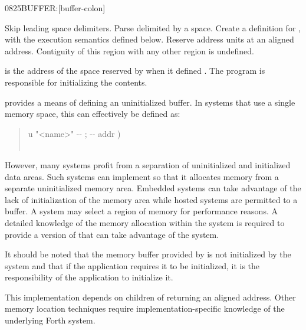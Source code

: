 \begin{worddef}{0825}{BUFFER:}[buffer-colon]%
\item {}

	Skip leading space delimiters. Parse  delimited by a space.
	Create a definition for , with the execution semantics defined
	below.  Reserve  address units at an aligned address.
	Contiguity of this region with any other region is undefined.

\execute[name]

	 is the address of the space reserved by  when
	it defined .  The program is responsible for initializing the
	contents.

	\begin{rationale}
		 provides a means of defining an uninitialized buffer.
		In systems that use a single memory space, this can effectively
		be defined as:

		\begin{quote}\ttfamily
			\word{:}   u "<name>" -{}- ; -{}- addr ) \\
			\tab\,  \\
			\word{;}
		\end{quote} 

		However, many systems profit from a separation of uninitialized and
		initialized data areas.  Such systems can implement  so
		that it allocates memory from a separate uninitialized memory area.
		Embedded systems can take advantage of the lack of initialization of the
		memory area while hosted systems are permitted to 
		a buffer.
		A system may select a region of memory for performance reasons.
		A detailed knowledge of the memory allocation within the system
		is required to provide a version of  that can take
		advantage of the system.

		It should be noted that the memory buffer provided by 
		is not initialized by the system and that if the application requires
		it to be initialized, it is the responsibility of the application to
		initialize it.
	\end{rationale}

	\begin{implement} %
		\dffamily
		This implementation depends on children of 
		returning an aligned address.  Other memory location techniques
		require implementation-specific knowledge of the underlying Forth
		system.


\end{implement}
\end{worddef}
